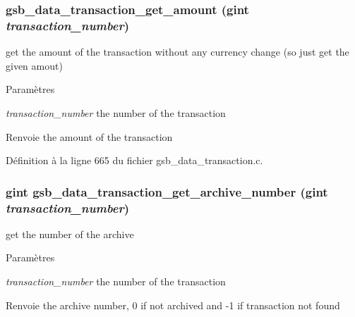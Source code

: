 \subsubsection[{gsb\_\-data\_\-transaction\_\-get\_\-amount}]{ gsb\_\-data\_\-transaction\_\-get\_\-amount (gint {\em transaction\_\-number})}\label{gsb__data__transaction_8c_a632c5ba71e742b3ac063b4b3207cf032}
get the amount of the transaction without any currency change (so just get the given amout)


\begin{DoxyParams}{Paramètres}
\item[{\em transaction\_\-number}]the number of the transaction\end{DoxyParams}
\begin{DoxyReturn}{Renvoie}
the amount of the transaction 
\end{DoxyReturn}


Définition à la ligne 665 du fichier gsb\_\-data\_\-transaction.c.

\subsubsection[{gsb\_\-data\_\-transaction\_\-get\_\-archive\_\-number}]{\setlength{\rightskip}{0pt plus 5cm}gint gsb\_\-data\_\-transaction\_\-get\_\-archive\_\-number (gint {\em transaction\_\-number})}\label{gsb__data__transaction_8c_a5dfc3ab337c363b46380bf962a97d8d2}
get the number of the archive


\begin{DoxyParams}{Paramètres}
\item[{\em transaction\_\-number}]the number of the transaction\end{DoxyParams}
\begin{DoxyReturn}{Renvoie}
the archive number, 0 if not archived and -\/1 if transaction not found 
\end{DoxyReturn}


